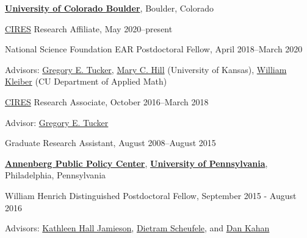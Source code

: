 \documentclass[10pt]{article}
\begin{document}
\href{http://www.colorado.edu/}{\textbf{University of Colorado Boulder}},
Boulder, Colorado
\begin{outerlist}
	\item[] \href{https://cires.colorado.edu/}{CIRES} Research Affiliate, May 2020--present
		\item[] National Science Foundation EAR Postdoctoral Fellow, April 2018--March 2020
	\begin{innerlist}
		\item Advisors:
		\href{https://www.colorado.edu/geologicalsciences/greg-tucker}{Gregory E. Tucker},  
		\href{https://geo.ku.edu/hill-mary-c}{Mary C. Hill} (University of Kansas), 
		\href{http://amath.colorado.edu/faculty/kleiberw/}{William Kleiber} (CU Department of Applied Math)
	\end{innerlist}
	\item[] \href{https://cires.colorado.edu/}{CIRES} Research Associate, October 2016--March 2018
		\begin{innerlist}
		\item Advisor:
		\href{https://www.colorado.edu/geologicalsciences/greg-tucker}{Gregory E. Tucker}
		\end{innerlist}
	\item[] Graduate Research Assistant, August 2008--August 2015\\
\end{outerlist}

\href{http://www.annenbergpublicpolicycenter.org/}{\textbf{Annenberg Public Policy Center}}, \href{http://www.upenn.edu}{\textbf{University of Pennsylvania}}, Philadelphia, Pennsylvania
\begin{outerlist}
	\item[] William Henrich Distinguished Postdoctoral Fellow, September 2015 - August 2016
	\begin{innerlist}
	 \item Advisors:
	  \href{https://www.asc.upenn.edu/people/faculty/kathleen-hall-jamieson-phd}{Kathleen Hall Jamieson},  
	  \href{http://www.dietramscheufele.com/}{Dietram Scheufele}, and
	  \href{http://www.culturalcognition.net/kahan/}{Dan Kahan}
	 \end{innerlist}
\end{outerlist}
\end{document}
